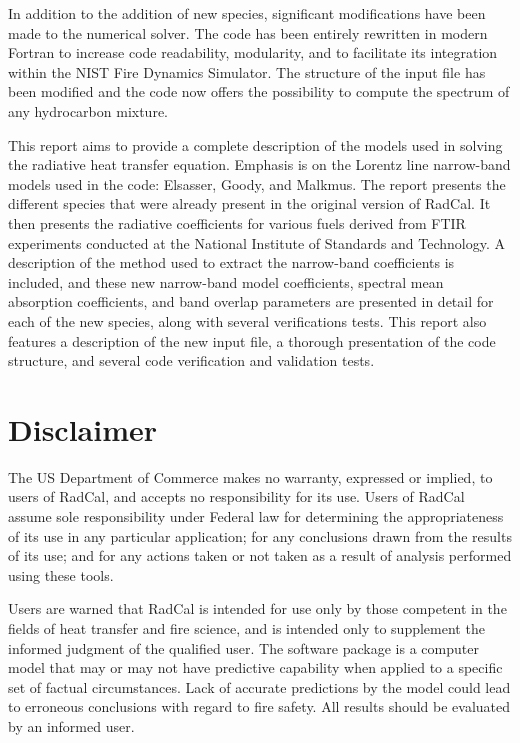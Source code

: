 \documentclass[11pt]{book}
\begin{document}
In addition to the addition of new species, significant modifications have been made to the numerical solver. The code has been entirely rewritten in modern Fortran to increase code readability, modularity, and to facilitate its integration within the NIST Fire Dynamics Simulator. The structure of the input file has been modified and the code now offers the possibility to compute the spectrum of any hydrocarbon mixture.

This report aims to provide a complete description of the models used in solving the radiative heat transfer equation. Emphasis is on the Lorentz line narrow-band models used in the code: Elsasser, Goody, and Malkmus. The report presents the different species that were already present in the original version of RadCal. It then presents the radiative coefficients for various fuels derived from FTIR experiments conducted at the National Institute of Standards and Technology. A description of the method used to extract the narrow-band coefficients is included, and these new narrow-band model coefficients, spectral mean absorption coefficients, and band overlap parameters are presented in detail for each of the new species, along with several verifications tests. This report also features a description of the new input file, a thorough presentation of the code structure, and several code verification and validation tests.

\chapter{Disclaimer}

The US Department of Commerce makes no warranty, expressed or implied,
to users of RadCal, and accepts no responsibility for its use.
Users of RadCal assume sole responsibility under Federal law for determining
the appropriateness of its use in any particular application;
for any conclusions drawn from the results of its use; and for any
actions taken or not taken as a result of analysis performed using these tools.

Users are warned that RadCal is intended for use only by those competent
in the fields of heat transfer and fire science,
and is intended only to supplement the informed judgment of the qualified user.
The software package is a computer model that may or may not have predictive
capability when applied to a specific set of factual circumstances.
Lack of accurate predictions by the model could lead to erroneous
conclusions with regard to fire safety. All results should be evaluated by an informed user.
\end{document}
